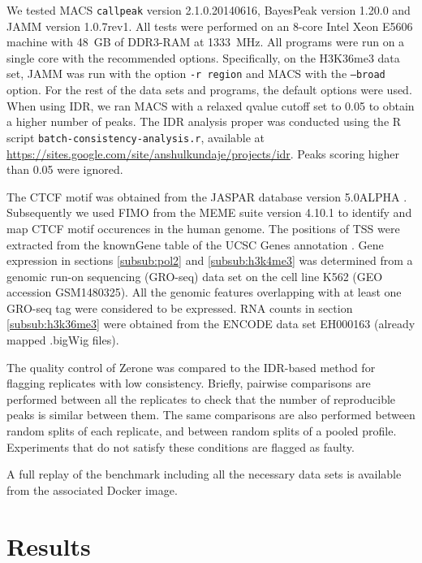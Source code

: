 \documentclass{bioinfo}
\begin{document}
\begin{methods}
We tested MACS \texttt{callpeak} version 2.1.0.20140616, BayesPeak
version 1.20.0 and JAMM version 1.0.7rev1. All tests were performed on
an 8-core Intel Xeon E5606 machine with 48~GB of DDR3-RAM at 1333~MHz.
All programs were run on a single core with the recommended options.
Specifically, on the H3K36me3 data set, JAMM was run with the option
\texttt{-r region} and MACS with the \texttt{--broad} option. For the rest of
the data sets and programs, the default options were used.
When using IDR, we ran MACS with a relaxed qvalue cutoff set to 0.05
to obtain a higher number of peaks. The IDR analysis proper was conducted
using the R script \texttt{batch-consistency-analysis.r}, available at
\href{https://sites.google.com/site/anshulkundaje/projects/idr}{https://sites.google.com/site/anshulkundaje/projects/idr}.
Peaks scoring higher than 0.05 were ignored.

The CTCF motif was obtained from the JASPAR database version
5.0{\textunderscore}ALPHA \citep[motif ID MA0139.1,][]{pmid24194598}.
Subsequently we used FIMO \citep{pmid21330290} from the MEME suite version
4.10.1 \citep{pmid19458158} to identify and map CTCF motif occurences in
the human genome. The positions of TSS were extracted from the knownGene
table of the UCSC Genes annotation \citep{Karolchik2004}.
Gene expression in sections \ref{subsub:pol2} and \ref{subsub:h3k4me3}
was determined from a genomic run-on sequencing (GRO-seq)
data set on the cell line K562 (GEO accession GSM1480325).
All the genomic features overlapping with at least one GRO-seq tag
were considered to be expressed.
RNA counts in section \ref{subsub:h3k36me3} were obtained from the
ENCODE data set EH000163 (already mapped .bigWig files).

The quality control of Zerone was compared to the IDR-based method
for flagging replicates with low consistency. Briefly, pairwise
comparisons are performed between all the replicates to check that
the number of reproducible peaks is similar between them. The
same comparisons are also performed between random splits of each
replicate, and between random splits of a pooled profile. Experiments
that do not satisfy these conditions are flagged as faulty.

A full replay of the benchmark including all the necessary data sets
is available from the associated Docker image.

\end{methods}

\section{Results}
\label{sec:results}
\end{document}
